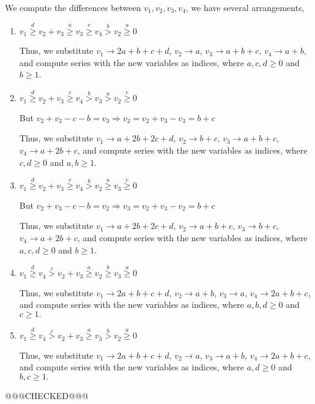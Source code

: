 \documentclass{article}
\begin{document}
We compute the differences between $v_1,v_2,v_3,v_4$, we have several arrangements,
\begin{enumerate}
    \item 
$v_1\overset{d}{\geq}{v_2+v_3}\overset{a}{\geq}v_3\overset{c}{\geq}{v_4}\overset{b}>v_2\overset{a}{\geq}{0}$

Thus, we substitute $v_1\rightarrow{2a+b+c+d}$, $v_2\rightarrow{a}$, $v_3\rightarrow{a+b+c}$, $v_4\rightarrow{a+b}$, and compute series with the new variables as indices, where $a,c,d\geq{0}$ and $b\geq{1}$.
\item 
$v_1\overset{d}{\geq}{v_2+v_3}\overset{c}{\geq}v_4\overset{b}{>}{v_3}\overset{a}{>}v_2\overset{e}{\geq}{0}$

But $v_2+v_3-c-b=v_3\Rightarrow{v_2=v_2+v_3-v_3=b+c}$

Thus, we substitute $v_1\rightarrow{a+2b+2c+d}$, $v_2\rightarrow{b+c}$, $v_3\rightarrow{a+b+c}$, $v_4\rightarrow{a+2b+c}$, and compute series with the new variables as indices, where $c,d\geq{0}$ and $a,b\geq{1}$.

\item 
$v_1\overset{d}{\geq}{v_2+v_3}\overset{c}{\geq}v_4\overset{b}{>}{v_2}\overset{a}{\geq}v_3\overset{e}{\geq}{0}$

But $v_2+v_3-c-b=v_2\Rightarrow{v_3=v_2+v_3-v_2=b+c}$

Thus, we substitute $v_1\rightarrow{a+2b+2c+d}$, $v_2\rightarrow{a+b+c}$, $v_3\rightarrow{b+c}$, $v_4\rightarrow{a+2b+c}$, and compute series with the new variables as indices, where $a,c,d\geq{0}$ and $b\geq{1}$.

\item 
$v_1\overset{d}{\geq}{v_4}\overset{c}{>}v_2+v_3\overset{a}{\geq}{v_2}\overset{b}{\geq}v_3\overset{a}{\geq}{0}$

Thus, we substitute $v_1\rightarrow{2a+b+c+d}$, $v_2\rightarrow{a+b}$, $v_3\rightarrow{a}$, $v_4\rightarrow{2a+b+c}$, and compute series with the new variables as indices, where $a,b,d\geq{0}$ and $c\geq{1}.$

\item 
$v_1\overset{d}{\geq}{v_4}\overset{c}{>}v_2+v_3\overset{a}{\geq}{v_3}\overset{b}{>}v_2\overset{a}{\geq}{0}$

Thus, we substitute $v_1\rightarrow{2a+b+c+d}$, $v_2\rightarrow{a}$, $v_3\rightarrow{a+b}$, $v_4\rightarrow{2a+b+c}$, and compute series with the new variables as indices, where $a,d\geq{0}$ and $b,c\geq{1}.$
\end{enumerate}


@@@CHECKED@@@
\end{document}
